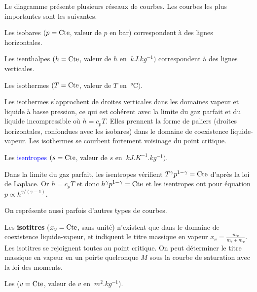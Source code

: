 \documentclass[12pt,fancy]{cours}
\begin{document}
 Le diagramme présente plusieurs réseaux de courbes. Les courbes les plus importantes sont les suivantes.
\begin{liste}
\item Les isobares $(p=\text{Cte}$, valeur de $p$ en bar) correspondent à des lignes horizontales.
\item Les isenthalpes $(h=\text{Cte}$, valeur de $h$ en $\SI{}{kJ.kg^{-1}})$ correspondent à des lignes verticales.
\item  Les \textcolor{JoliRouge}{isothermes}  $(T=\text{Cte}$, valeur de $T$ en $\SI{}{\celsius})$.
\begin{remarque}
  Les isothermes s’approchent de droites verticales dans les domaines vapeur et liquide à basse pression, ce qui est cohérent avec la limite du gaz parfait et du liquide incompressible où $h=c_pT$. Elles prennent la forme de paliers (droites horizontales, confondues avec les isobares) dans le domaine de coexistence liquide-vapeur. Les isothermes se courbent fortement voisinage du point critique.
\end{remarque}
\item  Les \textcolor{blue}{isentropes} $(s=\text{Cte}$, valeur de $s$ en $\SI{}{kJ.K^{-1}.kg^{-1}})$.
\begin{remarque}
Dans la limite du gaz parfait, les isentropes vérifient $T^\gamma p^{1-\gamma}=\text{Cte}$ d'après la loi de Laplace. Or $h=c_p T$ et donc  $h^\gamma p^{1-\gamma}=\text{Cte}$ et les isentropes ont pour équation $p \propto h^{\gamma/(\gamma-1)}$.
\end{remarque}
\end{liste}
On représente aussi parfois d'autres types de courbes.
\begin{liste}
\item Les \textbf{isotitres} ($x_v=\text{Cte}$, sans unité) n’existent que dans le domaine de coexistence liquide-vapeur, et indiquent le titre massique en vapeur $x_v = \frac{m_v}{m_\ell + m_v}$. Les isotitres se rejoignent toutes au point critique. On peut déterminer le titre massique en vapeur en un poirte quelconque $M$ sous la courbe de saturation avec la loi des moments.
\item Les  $(v=\text{Cte}$, valeur de $v$ en $\SI{}{m^2.kg^{-1}}$).
\end{liste}
\end{document}
